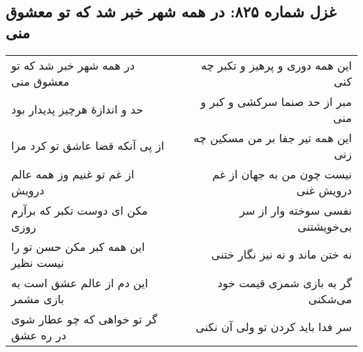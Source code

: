\begin{center}
\section*{غزل شماره ۸۲۵: در همه شهر خبر شد که تو معشوق منی}
\label{sec:825}
\begin{longtable}{l p{0.5cm} r}
در همه شهر خبر شد که تو معشوق منی
&&
این همه دوری و پرهیز و تکبر چه کنی
\\
حد و اندازهٔ هرچیز پدیدار بود
&&
مبر از حد صنما سرکشی و کبر و منی
\\
از پی آنکه قضا عاشق تو کرد مرا
&&
این همه تیر جفا بر من مسکین چه زنی
\\
از غم تو غنیم وز همه عالم درویش
&&
نیست چون من به جهان از غم درویش غنی
\\
مکن ای دوست تکبر که برآرم روزی
&&
نفسی سوخته وار از سر بی‌خویشتنی
\\
این همه کبر مکن حسن تو را نیست نظیر
&&
نه ختن ماند و نه نیز نگار ختنی
\\
این دم از عالم عشق است به بازی مشمر
&&
گر به بازی شمری قیمت خود می‌شکنی
\\
گر تو خواهی که چو عطار شوی در ره عشق
&&
سر فدا باید کردن تو ولی آن نکنی
\\
\end{longtable}
\end{center}
